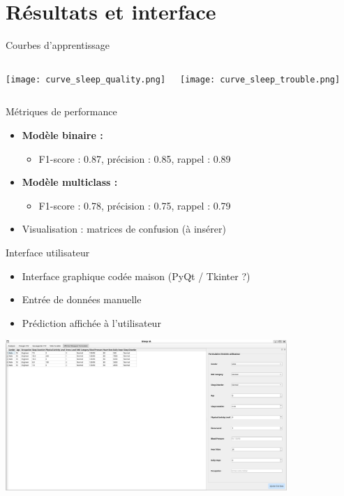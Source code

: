 \documentclass{beamer}
\begin{document}
\section{Résultats et interface}

\begin{frame}{Courbes d'apprentissage}
  \begin{columns}
    \texttt{[image: curve\_sleep\_quality.png]}

    \texttt{[image: curve\_sleep\_trouble.png]}
  \end{columns}
\end{frame}

\begin{frame}{Métriques de performance}
  \begin{itemize}
    \item \textbf{Modèle binaire :}
    \begin{itemize}
      \item F1-score : 0.87, précision : 0.85, rappel : 0.89
    \end{itemize}
    \item \textbf{Modèle multiclass :}
    \begin{itemize}
      \item F1-score : 0.78, précision : 0.75, rappel : 0.79
    \end{itemize}
    \item Visualisation : matrices de confusion (à insérer)
  \end{itemize}
\end{frame}

\begin{frame}{Interface utilisateur}
  \begin{itemize}
    \item Interface graphique codée maison (PyQt / Tkinter ?)
    \item Entrée de données manuelle
    \item Prédiction affichée à l'utilisateur
  \end{itemize}
  \includegraphics[width=0.8\textwidth]{screen_UI.png}
\end{frame}
\end{document}
